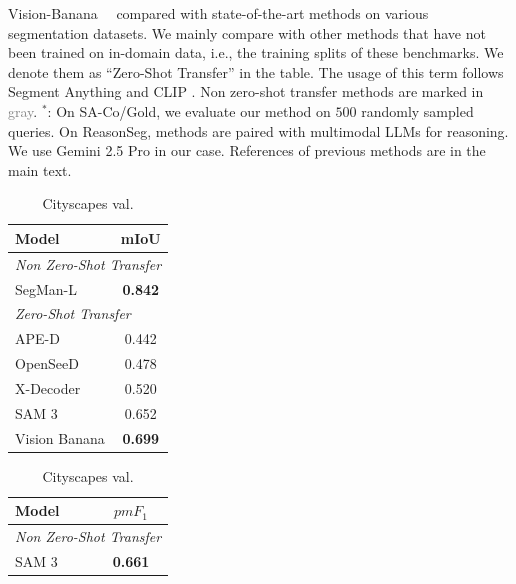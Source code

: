 \documentclass[11pt, a4paper, copyright, gdm]{google}
\begin{document}
\begin{table}[h]
    \caption{Vision-Banana \emojivb \ \ compared with state-of-the-art methods on various segmentation datasets.
    We mainly compare with other methods that have not been trained on in-domain data, i.e., the training splits of these benchmarks.
    We denote them as ``Zero-Shot Transfer'' in the table.
    The usage of this term follows Segment Anything \citep{kirillov2023segment} and CLIP \citep{radford2021learning_clip}.
    Non zero-shot transfer methods are marked in \textcolor{gray}{gray}.
    $^*$: On SA-Co/Gold, we evaluate our method on $500$ randomly sampled queries.
    On ReasonSeg, methods are paired with multimodal LLMs for reasoning. We use Gemini 2.5 Pro in our case.
    References of previous methods are in the main text.
    }
    
    \setlength{\tabcolsep}{3pt} 
    \begin{subtable}[t]{0.20\textwidth}
        \scriptsize
        \begin{tabular}[t]{@{}lc@{}}
        \toprule
        Model & mIoU \\
        \midrule
        \multicolumn{2}{l}{\color{gray} \textit{Non Zero-Shot Transfer}} \\
        \midrule
        \color{gray}SegMan-L & \color{gray}\textbf{0.842} \\
        \midrule
        \multicolumn{2}{l}{\textit{Zero-Shot Transfer}} \\
        \midrule
        APE-D & 0.442 \\
        OpenSeeD & 0.478 \\
        X-Decoder & 0.520 \\
        SAM 3 & 0.652 \\
        Vision Banana & \textbf{\color{win_green} 0.699} \\
        \bottomrule
        \end{tabular}
        \caption{Cityscapes val.}
        \label{tab-seg-cityscapes}
    \end{subtable}%
    \begin{subtable}[t]{0.20\textwidth}
        \scriptsize
        \begin{tabular}[t]{@{}lc@{}}
        \toprule
        Model & $pmF_1$ \\
        \midrule
        \multicolumn{2}{l}{\color{gray} \textit{Non Zero-Shot Transfer}} \\
        \midrule
        \color{gray} SAM 3 & \color{gray} \textbf{0.661} \\

\end{tabular}
\end{subtable}
\end{table}
\end{document}
